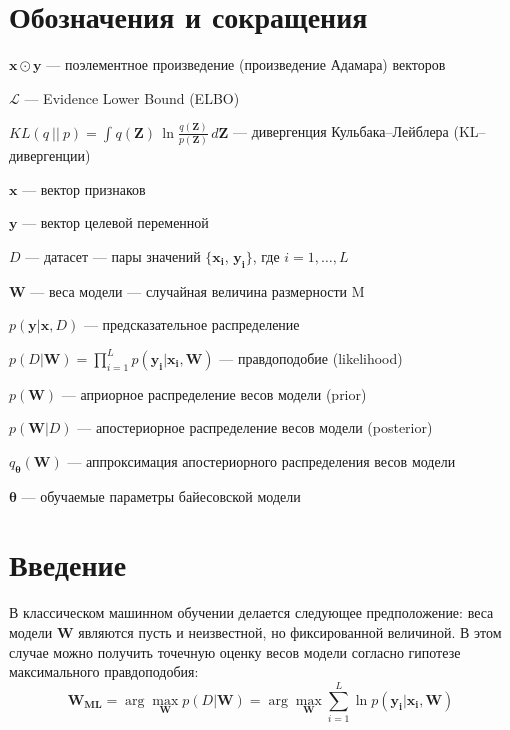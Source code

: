 \documentclass{article}
\newcommand{\argmax}{\arg\!\max}
\numberwithin{equation}{section}
\begin{document}
    \section{Обозначения и сокращения}
    $\pmb{x} \odot \pmb{y}$ --- поэлементное произведение (произведение Адамара) векторов \par
    $\mathcal{L}$ --- Evidence Lower Bound (ELBO) \par
    $
        KL(q~||~p)
        =
        \int_{}{
            q(\pmb{Z})
            \,
            \ln{
                \frac
                    {q(\pmb{Z})}
                    {p(\pmb{Z})}
            }
            \,
            d\pmb{Z}
        }
    $ --- дивергенция Кульбака--Лейблера (KL--дивергенции) \par
    $\pmb{x}$ --- вектор признаков \par
    $\pmb{y}$ --- вектор целевой переменной \par
    $D$ --- датасет --- пары значений $\{\pmb{x_i}$, $\pmb{y_i}\}$, где $i = 1, \dots, L$ \par
    $\pmb{W}$ --- веса модели --- случайная величина размерности M \par
    $p(\pmb{y} | \pmb{x}, D)$ --- предсказательное распределение \par
    $
        p(D | \pmb{W})
        =
        \prod_{i=1}^{L}{
            p(\pmb{y_i} | \pmb{x_i}, \pmb{W})
        }
    $ — правдоподобие (likelihood) \par
    $p(\pmb{W})$ --- априорное распределение весов модели (prior) \par
    $p(\pmb{W}| D)$ --- апостериорное распределение весов модели (posterior) \par
    $q_{\pmb{\theta}}(\pmb{W})$ --- аппроксимация апостериорного распределения весов модели \par
    $\pmb{\theta}$ --- обучаемые параметры байесовской модели \par

    \section{Введение}

    В классическом машинном обучении делается следующее предположение:
    веса модели $\pmb{W}$ являются пусть и неизвестной, но фиксированной величиной.
    В этом случае можно получить точечную оценку весов модели согласно гипотезе максимального правдоподобия:
    \begin{equation}\label{max_likelihood}
        \pmb{W_{ML}}
        =
        \argmax_{\pmb{W}} p(D | \pmb{W})
        =
        \argmax_{\pmb{W}} {
            \sum_{i=1}^{L}{
                \ln{
                    p(\pmb{y_{i}} | \pmb{x_{i}}, \pmb{W})
                }
            }
        }
    \end{equation}
\end{document}

